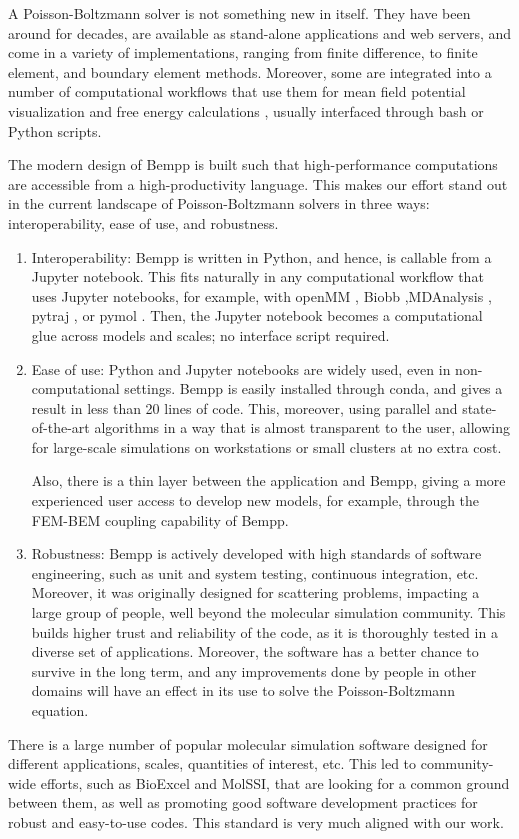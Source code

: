A Poisson-Boltzmann solver is not something new in itself. They have been around for decades, are available as stand-alone applications and web servers, and come in a variety of implementations, ranging from finite difference, to finite element, and boundary element methods. Moreover, some are integrated into a number of computational workflows that use them for mean field potential visualization \cite{HumphreyETal1996} and free energy calculations \cite{MillerETal2012,KumariETal2014,WangETal2018}, usually interfaced through bash or Python scripts.

The modern design of Bempp is built such that high-performance computations are accessible from a high-productivity language. This makes our effort stand out in the current landscape of Poisson-Boltzmann solvers in three ways: interoperability, ease of use, and robustness. 
\begin{enumerate}
\item Interoperability: Bempp is written in Python, and hence, is callable from a Jupyter notebook. This fits naturally in any computational workflow that uses Jupyter notebooks, for example, with openMM \cite{EastmanETal2017}, Biobb \cite{AndrioETal2019},MDAnalysis \cite{GowersETal2019}, pytraj \cite{RoeCheatham2013}, or pymol \cite{PyMOL}. Then, the Jupyter notebook becomes a computational glue across models and scales; no interface script required. 

\item Ease of use: Python and Jupyter notebooks are widely used, even in non-computational settings. Bempp is easily installed through conda, and gives a result in less than 20 lines of code. This, moreover, using parallel and state-of-the-art algorithms in a way that is almost transparent to the user, allowing for large-scale simulations on workstations or small clusters at no extra cost.

Also, there is a thin layer between the application and Bempp, giving a more experienced user access to develop new models, for example, through the FEM-BEM coupling capability of Bempp.

\item Robustness: Bempp is actively developed with high standards of software engineering, such as unit and system testing, continuous integration, etc. Moreover, it was originally designed for scattering problems, impacting a large group of people, well beyond the molecular simulation community. This builds higher trust and reliability of the code, as it is thoroughly tested in a diverse set of applications. Moreover, the software has a better chance to survive in the long term, and any improvements done by people in other domains will have an effect in its use to solve the Poisson-Boltzmann equation. 

\end{enumerate}

There is a large number of popular molecular simulation software designed for different applications, scales, quantities of interest, etc. This led to community-wide efforts, such as BioExcel and MolSSI, that are looking for a common ground between them, as well as promoting good software development practices for robust and easy-to-use codes. This standard is very much aligned with our work.

